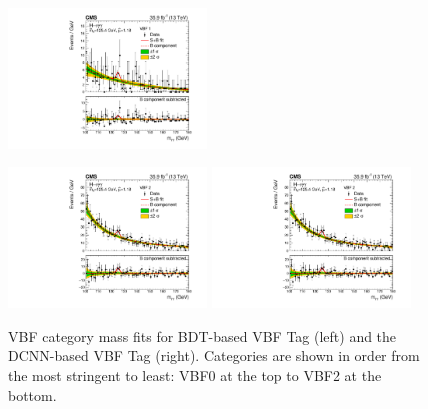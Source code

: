 \begin{figure}[h!]
\begin{center}
        \includegraphics[width=0.47\textwidth]{figures/stats_results/CMS-HIG-16-040_Figure_012-b.pdf}
    \end{center}
    \begin{center}
        \includegraphics[width=0.47\textwidth]{figures/stats_results/CMS-HIG-16-040_Figure_012-c.pdf}
        \includegraphics[width=0.47\textwidth]{figures/stats_results/CMS-HIG-16-040_Figure_012-c.pdf}
    \end{center}
    \caption{VBF category mass fits for BDT-based VBF Tag (left) and the DCNN-based VBF Tag (right).
             Categories are shown in order from the most stringent to least: VBF0 at the top to VBF2 at the bottom.}
        \label{fig:stats_results:vbf_mass_plots}
\end{figure}



